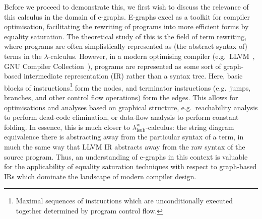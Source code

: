 Before we proceed to demonstrate this, we first wish to discuss the relevance of this calculus in the domain of e-graphs.
E-graphs excel as a toolkit for compiler optimisation, facilitating the rewriting of programs into more efficient forms by equality saturation.
The theoretical study of this is the field of term rewriting, where programs are often simplistically represented as (the abstract syntax of) terms in the $\lambda$-calculus.
However, in a modern optimising compiler (e.g.\ LLVM~\cite{lattnerLLVMCompilationFramework2004}, GNU Compiler Collection~\cite{merrillGenericGimpleNew2003}), programs are represented as some sort of graph-based intermediate representation (IR) rather than a syntax tree.
Here, basic blocks of instructions\footnote{Maximal sequences of instructions which are unconditionally executed together determined by program control flow.} form the nodes, and terminator instructions (e.g.\ jumps, branches, and other control flow operations) form the edges.
This allows for optimisations and analyses based on graphical structure, e.g.\ reachability analysis to perform dead-code elimination, or data-flow analysis to perform constant folding.
In essence, this is much closer to $\lambda^\approx_{\text{lsub}}$-calculus: the string diagram equivalence there is abstracting away from the particular syntax of a term, in much the same way that LLVM IR abstracts away from the raw syntax of the source program.
Thus, an understanding of e-graphs in this context is valuable for the applicability of equality saturation techniques with respect to graph-based IRs which dominate the landscape of modern compiler design.

